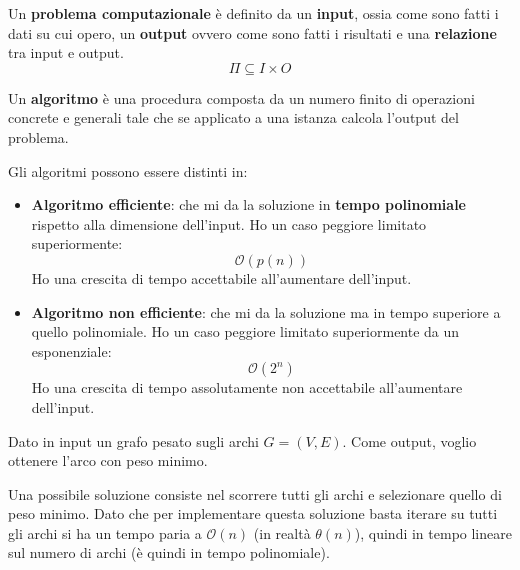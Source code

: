 \begin{definizione}
    Un \textbf{problema computazionale} è definito da un \textbf{input}, ossia come sono fatti i dati su cui opero, un \textbf{output} ovvero come sono fatti i risultati e una \textbf{relazione} tra input e output.
    \begin{equation}
        \Pi \subseteq I \times O
    \end{equation}
\end{definizione}
\begin{definizione} 
    Un \textbf{algoritmo} è una procedura composta da un numero finito di operazioni concrete e generali tale che se applicato a una istanza calcola l'output del problema. 
    
    Gli algoritmi possono essere distinti in:
    \begin{itemize}
        \item \textbf{Algoritmo efficiente}: che mi da la soluzione in \textbf{tempo polinomiale} rispetto alla dimensione dell'input. Ho un caso peggiore limitato superiormente: 
        \begin{equation}
            \mathcal{O}(p(n))
        \end{equation}
        Ho una crescita di tempo accettabile all'aumentare dell'input.
        \item \textbf{Algoritmo non efficiente}: che mi da la soluzione ma in tempo superiore a quello polinomiale. Ho un caso peggiore limitato superiormente da un esponenziale:
        \begin{equation}
            \mathcal{O}(2^n)
        \end{equation}
        Ho una crescita di tempo assolutamente non accettabile all'aumentare dell'input.
    \end{itemize}
\end{definizione}
\begin{esempio} 
    Dato in input un grafo pesato sugli archi $G = (V,E)$. Come output, voglio ottenere l'arco con peso minimo.
    
    Una possibile soluzione consiste nel scorrere tutti gli archi e selezionare quello di peso minimo. Dato che per implementare questa soluzione basta iterare su tutti gli archi si ha un tempo paria a $\mathcal{O}(n)$ (in realtà $\theta(n)$), quindi in tempo lineare sul numero di archi (è quindi in tempo polinomiale).
\end{esempio}
